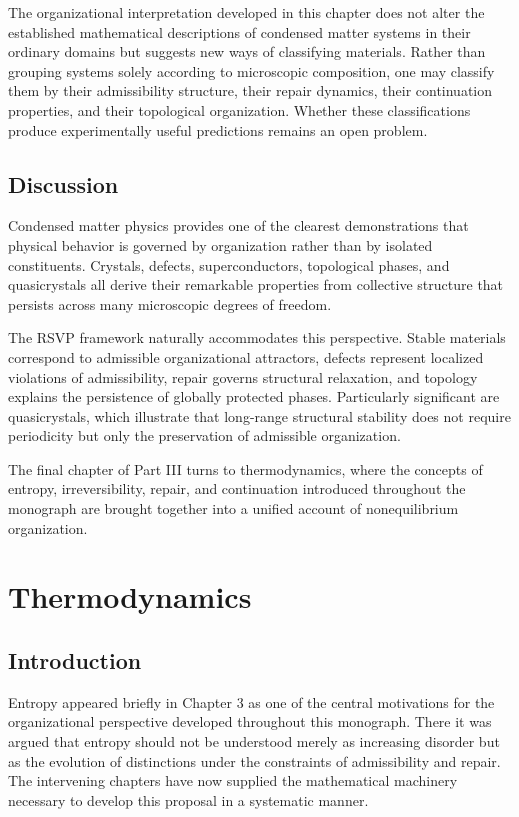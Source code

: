 \documentclass[11pt,oneside]{book}
\numberwithin{equation}{chapter}
\theoremstyle{definition}
\theoremstyle{plain}
\begin{document}
The organizational interpretation developed in this chapter does not alter the established mathematical descriptions of condensed matter systems in their ordinary domains but suggests new ways of classifying materials. Rather than grouping systems solely according to microscopic composition, one may classify them by their admissibility structure, their repair dynamics, their continuation properties, and their topological organization. Whether these classifications produce experimentally useful predictions remains an open problem.

\section{Discussion}

Condensed matter physics provides one of the clearest demonstrations that
physical behavior is governed by organization rather than by isolated
constituents. Crystals, defects, superconductors, topological phases, and
quasicrystals all derive their remarkable properties from collective
structure that persists across many microscopic degrees of freedom.

The RSVP framework naturally accommodates this perspective. Stable materials
correspond to admissible organizational attractors, defects represent
localized violations of admissibility, repair governs structural relaxation,
and topology explains the persistence of globally protected phases.
Particularly significant are quasicrystals, which illustrate that
long-range structural stability does not require periodicity but only the
preservation of admissible organization.

The final chapter of Part III turns to thermodynamics, where the concepts of
entropy, irreversibility, repair, and continuation introduced throughout the
monograph are brought together into a unified account of nonequilibrium
organization.

\chapter{Thermodynamics}

\section{Introduction}

Entropy appeared briefly in Chapter 3 as one of the central motivations for
the organizational perspective developed throughout this monograph. There
it was argued that entropy should not be understood merely as increasing
disorder but as the evolution of distinctions under the constraints of
admissibility and repair. The intervening chapters have now supplied the
mathematical machinery necessary to develop this proposal in a systematic
manner.
\end{document}
